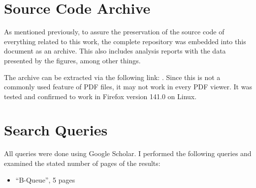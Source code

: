\chapter{Source Code Archive}
\label{app:source-code-archive}
As mentioned previously, to assure the preservation of the source code of everything related to this work,
the complete repository was embedded into this document as an archive.
This also includes analysis reports with the data presented by the figures, among other things.

The archive can be extracted via the following link: .
Since this is not a commonly used feature of PDF files, it may not work in every PDF viewer.
It was tested and confirmed to work in Firefox version 141.0 on Linux.

\chapter{Search Queries}
\label{app:repro-search-queries}
All queries were done using Google Scholar.
I performed the following queries and examined the stated number of pages of the results:
\begin{itemize}
    \item ``B-Queue'', 5 pages
\end{itemize}





{
    \listoffigures

    \let\clearpage\relax
    \let\cleardoublepage\relax

    \listoflistings
}

